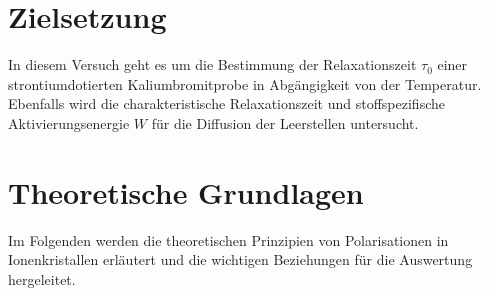 \section{Zielsetzung}
In diesem Versuch geht es um die Bestimmung der Relaxationszeit $\tau_0$ einer strontiumdotierten Kaliumbromitprobe in Abgängigkeit von der Temperatur. Ebenfalls wird die charakteristische Relaxationszeit und stoffspezifische Aktivierungsenergie $W$ für die Diffusion der Leerstellen
untersucht.

\section{Theoretische Grundlagen}

Im Folgenden werden die theoretischen Prinzipien von Polarisationen in Ionenkristallen erläutert und die wichtigen Beziehungen für die Auswertung hergeleitet.

